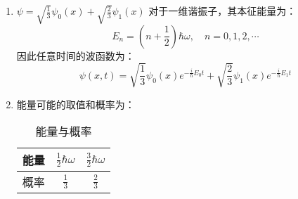 \subsection{ }
\begin{enumerate}
\item $\psi=\sqrt{\frac{1}{3}}\psi_{0}(x)+\sqrt{\frac{2}{3}}\psi_{1}(x)$
对于一维谐振子，其本征能量为：
\begin{equation}
E_{n}=(n+\frac{1}{2})\hbar \omega,\quad n=0,1,2,\cdots
\end{equation}
因此任意时间的波函数为：
\begin{equation}
\psi(x,t)=\sqrt{\frac{1}{3}}\psi_{0}(x)e^{-\frac{i}{\hbar}E_{0}t}+\sqrt{\frac{2}{3}}\psi_{1}(x)e^{-\frac{i}{\hbar}E_{1}t}
\end{equation}

\item 能量可能的取值和概率为：
\begin{table}[ht]
\centering
\caption{能量与概率}\label{TJU14A_tab2}
\begin{tabular}{|c|c|c|}
\hline
能量 & $\frac{1}{2}\hbar\omega$ & $\frac{3}{2}\hbar\omega$ \\
\hline
概率 & $\frac{1}{3}$ & $\frac{2}{3}$ \\
\hline
\end{tabular}
\end{table}
\end{enumerate}